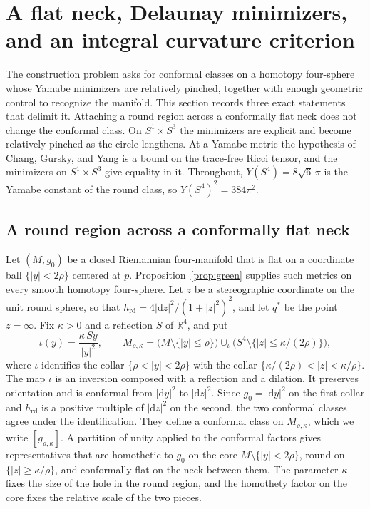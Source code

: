 \documentclass[11pt]{article}
\numberwithin{equation}{section}
\newcommand{\rd}{\mathrm{rd}}
\newcommand{\dd}{\mathrm{d}}
\newcommand{\RR}{\mathbb{R}}
\newcommand{\Sphere}{S^4}
\newcommand{\abs}[1]{\lvert #1\rvert}
\begin{document}
\section{A flat neck, Delaunay minimizers, and an integral curvature criterion}\label{sec:necklace-tests}
\label{sec:tests}

The construction problem asks for conformal classes on a homotopy
four-sphere whose Yamabe minimizers are relatively pinched, together
with enough geometric control to recognize the manifold. This section
records three exact statements that delimit it. Attaching a round
region across a conformally flat neck does not change the conformal
class. On \(S^1\times S^3\) the minimizers are explicit and become
relatively pinched as the circle lengthens. At a Yamabe metric the
hypothesis of Chang, Gursky, and Yang is a bound on the trace-free
Ricci tensor, and the minimizers on \(S^1\times S^3\) give equality in
it. Throughout, \(Y(\Sphere)=8\sqrt6\,\pi\) is the Yamabe constant of
the round class, so \(Y(\Sphere)^2=384\pi^2\).

\subsection{A round region across a conformally flat neck}
\label{sec:flat-neck}

Let \((M,g_0)\) be a closed Riemannian four-manifold that is flat on a
coordinate ball \(\{\abs y<2\rho\}\) centered at \(p\).
Proposition~\ref{prop:green} supplies such metrics on every smooth
homotopy four-sphere. Let \(z\) be a stereographic coordinate on the
unit round sphere, so that
\(h_{\rd}=4\abs{\dd z}^2/(1+\abs z^2)^2\), and let \(q^*\) be the point
\(z=\infty\). Fix \(\kappa>0\) and a reflection \(S\) of \(\RR^4\), and
put
\[
 \iota(y)=\frac{\kappa\,Sy}{\abs y^2},\qquad
 M_{\rho,\kappa}=\bigl(M\setminus\{\abs y\le\rho\}\bigr)\cup_{\iota}
        \bigl(\Sphere\setminus\{\abs z\le\kappa/(2\rho)\}\bigr),
\]
where \(\iota\) identifies the collar \(\{\rho<\abs y<2\rho\}\) with the
collar \(\{\kappa/(2\rho)<\abs z<\kappa/\rho\}\). The map \(\iota\) is
an inversion composed with a reflection and a dilation. It preserves
orientation and is conformal from \(\abs{\dd y}^2\) to
\(\abs{\dd z}^2\). Since \(g_0=\abs{\dd y}^2\) on the first collar and
\(h_{\rd}\) is a positive multiple of \(\abs{\dd z}^2\) on the second,
the two conformal classes agree under the identification. They define
a conformal class on \(M_{\rho,\kappa}\), which we write
\([g_{\rho,\kappa}]\). A partition of unity applied to the conformal
factors gives representatives that are homothetic to \(g_0\) on the
core \(M\setminus\{\abs y<2\rho\}\), round on
\(\{\abs z\ge\kappa/\rho\}\), and conformally flat on the neck between
them. The parameter \(\kappa\) fixes the size of the hole in the round
region, and the homothety factor on the core fixes the relative scale
of the two pieces.
\end{document}
